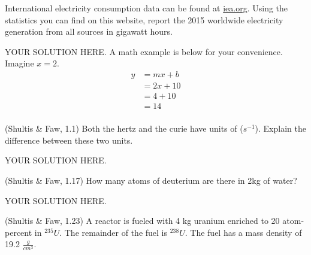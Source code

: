 \documentclass[12pts,answers,addpoints]{exam}
\begin{document}
\begin{questions}
\question[5] International electricity consumption data can be found at \href{http://iea.org}{iea.org}.
        Using the statistics you can find on this website, 
                report the 2015 worldwide electricity generation from all 
                sources in gigawatt hours.
        \begin{solution}
                        YOUR SOLUTION HERE.
                        A math example is below for your convenience. Imagine 
                        $x=2$.
                \begin{align*}
                        y &= mx + b\\
                          &= 2x + 10\\
                          &= 4 + 10\\
                          &= \boxed{14}\\
                \end{align*}
        \end{solution}

\question[5] (Shultis \& Faw, 1.1) Both the hertz and the curie have units of 
($s^{-1}$). Explain the difference between these two units.
\begin{solution}
                        YOUR SOLUTION HERE.
\end{solution}

\question[10] (Shultis \& Faw, 1.17) How many atoms of deuterium are there in 
2kg of water?
\begin{solution}
                        YOUR SOLUTION HERE.
\end{solution}

\question (Shultis \& Faw, 1.23) A reactor is fueled with 4 kg uranium enriched to 20 atom-percent in 
$^{235}U$. The remainder of the fuel is $^{238}U$. The fuel has a mass density 
of 19.2 $\frac{g}{cm^3}$.


\end{questions}
\end{document}
